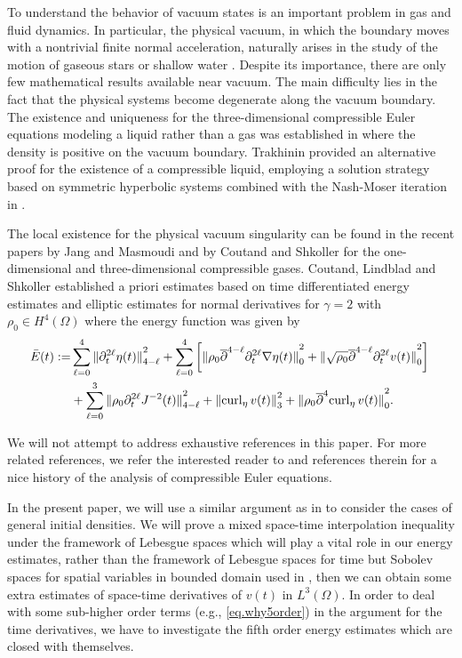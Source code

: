 \documentclass[12pt,twoside,reqno]{amsart}
\numberwithin{equation}{section}
\theoremstyle{definition}
\theoremstyle{remark}
\begin{document}
To understand the behavior of vacuum states is an important problem in gas and fluid dynamics. In particular, the physical vacuum, in which the boundary moves with a nontrivial finite normal
acceleration, naturally arises in the study of the motion of gaseous stars or shallow water \cite{JM10}.
Despite its importance, there are only few mathematical results available near vacuum.
The main difficulty lies in the fact that the physical systems become degenerate along the
vacuum boundary. The existence and uniqueness for the three-dimensional compressible Euler equations modeling a liquid rather than a gas was established in \cite{L2} where the density is positive on the vacuum boundary. Trakhinin provided an alternative proof for the existence of a compressible liquid, employing a solution strategy based on symmetric hyperbolic systems combined with the Nash-Moser iteration in \cite{Tr09}.

The local existence for the physical vacuum singularity can be found in the recent papers by Jang and Masmoudi \cite{JM09,JM10} and by Coutand and Shkoller \cite{CS11,CS12} for the one-dimensional and three-dimensional compressible gases.  Coutand, Lindblad and Shkoller \cite{CLS10} established a priori estimates based on time differentiated energy estimates and elliptic estimates for normal derivatives for $\gamma=2$ with ${\rho_0}\in H^4(\Omega)$ where the energy function was given by
\begin{align*}
  \bar{E}(t):=&\sum_{\ell=0}^4{\Vert{{\partial}_t^{2\ell}\eta(t)}\Vert}_{4-\ell}^2+\sum_{\ell=0}^4 \left[{\Vert{{\rho_0} {\overline{\partial}}^{4-\ell} {\partial}_t^{2\ell} {\nabla}\eta(t)}\Vert}_0^2+{\Vert{\sqrt{\rho_0}{\overline{\partial}}^{4-\ell} {\partial}_t^{2\ell } v(t)}\Vert}_0^2\right]{\nonumber}\\
  & +\sum_{\ell=0}^3{\Vert{{\rho_0} {\partial}_t^{2\ell} J^{-2}(t)}\Vert}_{4-\ell}^2+{\Vert{{\mathrm{curl}_\eta\,} v(t)}\Vert}_3^2+{\Vert{{\rho_0}{\overline{\partial}}^4{\mathrm{curl}_\eta\,} v(t)}\Vert}_0^2.
\end{align*}

We will not attempt to address exhaustive references in this paper. For more related references, we refer the interested reader to \cite{CS12,JM10} and references therein for a nice history of the analysis of compressible Euler equations.

In the present paper, we will use a similar argument as in \cite{CLS10} to consider the cases of general initial densities. We will prove a mixed space-time interpolation inequality under the framework of Lebesgue spaces which will play a vital role in our energy estimates, rather than the framework of Lebesgue spaces for time but Sobolev spaces for spatial variables in bounded domain used in \cite{CLS10}, then we can obtain some extra estimates of space-time derivatives of $v(t)$ in $L^3(\Omega)$. In order to deal with some sub-higher order terms (e.g., \eqref{eq.why5order}) in the argument for the time derivatives, we have to investigate the fifth order energy estimates which are closed with themselves.
\end{document}
